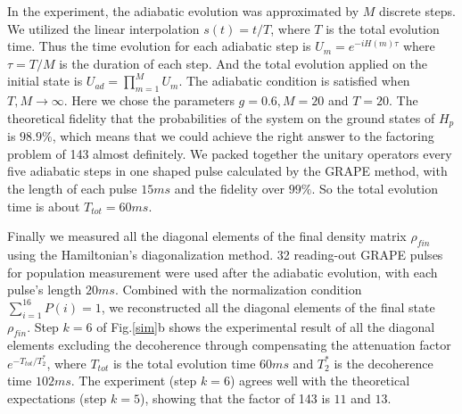 \documentclass[twocolumn,showpacs,twoside,10pt,prl]{revtex4}
\begin{document}
In the experiment, the adiabatic evolution was
approximated by $M$ discrete
steps\cite{Mitra_2005,Steffen,Peng_2005,peng_2008}. We utilized the
linear interpolation $s(t)=t/T$, where $T$ is the total evolution
time. Thus the time evolution for each adiabatic step is
$U_{m}=e^{-iH(m)\tau }$ where $\tau=T/M$ is the duration of each
step. And the total evolution applied on the initial state is
$U_{ad}=\prod_{m=1}^{M}U_{m}$. The adiabatic condition is satisfied
when $T,M\rightarrow\infty$. Here we chose the parameters $g=0.6,
M=20$ and $T=20$. The theoretical fidelity that the probabilities of
the system on the ground states of $H_p$ is $98.9\%$, which means
that we could achieve the right answer to the factoring problem of
143 almost definitely. We packed together the unitary operators every
five adiabatic steps in one shaped pulse calculated by the GRAPE method\cite{Khaneja}, with the length of each pulse $15ms$ and the fidelity over $99\%$. So the total evolution time is about $T_{tot}=60ms$.

Finally we measured all the diagonal elements of the final density
matrix $\rho_{fin}$ using the Hamiltonian's diagonalization method\cite{Dawei}. 32 reading-out GRAPE pulses for population measurement were used after the adiabatic evolution, with
each pulse's length $20ms$. Combined with the normalization condition
$\sum_{i=1}^{16}P(i)=1$, we reconstructed all the diagonal elements of
the final state $\rho_{fin}$. Step $k=6$ of Fig.\ref{sim}b shows the
experimental result of all the diagonal elements excluding the
decoherence through compensating the attenuation factor $e^{-T_{tot}/T_2^{*}}$, where $T_{tot}$ is the total evolution time $60ms$ and $T_2^{*}$ is the decoherence time $102ms$. The experiment (step $k=6$) agrees well with the theoretical expectations (step $k=5$), showing that the factor of 143 is $11$ and $13$.
\end{document}
